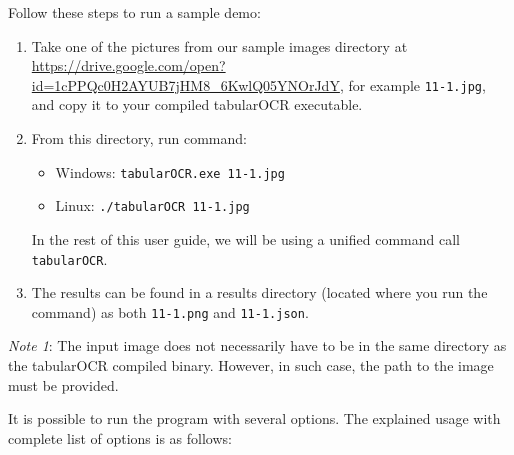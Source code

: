 Follow these steps to run a sample demo:
\begin{enumerate}
    \item Take one of the pictures from our sample images directory at \url{https://drive.google.com/open?id=1cPPQc0H2AYUB7jHM8_6KwlQ05YNOrJdY}, for example \texttt{11-1.jpg}, and copy it to your compiled tabularOCR executable.
    \item From this directory, run command:
        \begin{itemize}
            \item Windows: \texttt{tabularOCR.exe 11-1.jpg}
            \item Linux: \texttt{./tabularOCR 11-1.jpg}
        \end{itemize}
        In the rest of this user guide, we will be using a unified command call \texttt{tabularOCR}.
    \item The results can be found in a results directory (located where you run the command) as both \texttt{11-1.png} and \texttt{11-1.json}.
\end{enumerate}

\emph{Note 1}: The input image does not necessarily have to be in the same directory as the tabularOCR compiled binary. However, in such case, the path to the image must be provided.

It is possible to run the program with several options. The explained usage with complete list of options is as follows:

